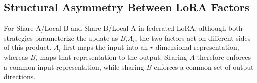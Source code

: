 \documentclass[lettersize,journal]{IEEEtran}
\begin{document}
	
	
	\subsection{Structural Asymmetry Between LoRA Factors}
	\label{subsec:lora_structural_asymmetry}
	
	For Share-A/Local-B and  Share-B/Local-A in federated LoRA, although both strategies parameterize the update
	as $B_iA_i$, the two factors act on different sides of this
	product. $A_i$ first maps the input into an $r$-dimensional
	representation, whereas $B_i$ maps that representation to the output.
	Sharing $A$ therefore enforces a common input representation, while
	sharing $B$ enforces a common set of output directions.
	
\end{document}
